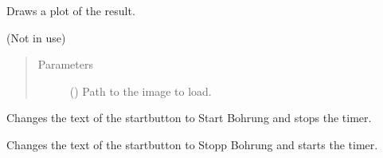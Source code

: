 \documentclass[letterpaper,10pt,english]{sphinxmanual}
\begin{document}
\begin{fulllineitems}
\begin{fulllineitems}
\begin{quote}
\begin{description}
\end{description}\end{quote}

\end{fulllineitems}


\begin{fulllineitems}
\label{\detokenize{anoog.automation:anoog.automation.graphical_user_interface.Predict_Window.draw_result}}
\sphinxAtStartPar
Draws a plot of the result.

\sphinxAtStartPar
(Not in use)
\begin{quote}\begin{description}
\item[{Parameters}] \leavevmode
\sphinxAtStartPar
{} () \textendash{} Path to the image to load.

\end{description}\end{quote}

\end{fulllineitems}


\begin{fulllineitems}
\label{\detokenize{anoog.automation:anoog.automation.graphical_user_interface.Predict_Window.drill_ends}}
\sphinxAtStartPar
Changes the text of the start\sphinxhyphen{}button to Start Bohrung and stops the timer.

\end{fulllineitems}


\begin{fulllineitems}
\label{\detokenize{anoog.automation:anoog.automation.graphical_user_interface.Predict_Window.drill_starts}}
\sphinxAtStartPar
Changes the text of the start\sphinxhyphen{}button to Stopp Bohrung and starts the timer.


\end{fulllineitems}
\end{fulllineitems}
\end{document}
